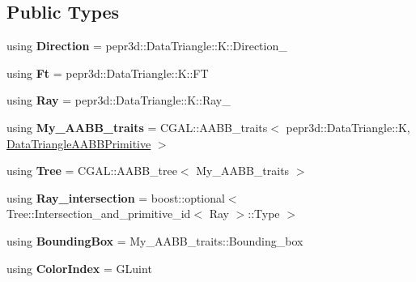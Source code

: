\subsection*{Public Types}
\begin{DoxyCompactItemize}
\item 
\mbox{\label{classpepr3d_1_1_geometry_a6077ec326305ac7fe4c3f6819b53c2fb}} 
using {\bfseries Direction} = pepr3d\+::\+Data\+Triangle\+::\+K\+::\+Direction\+\_
\item 
\mbox{\label{classpepr3d_1_1_geometry_a2902716bce3c243a990d3b89b1e3e62b}} 
using {\bfseries Ft} = pepr3d\+::\+Data\+Triangle\+::\+K\+::\+FT
\item 
\mbox{\label{classpepr3d_1_1_geometry_abf08f06fad7e1acf0298bbb32418ef0a}} 
using {\bfseries Ray} = pepr3d\+::\+Data\+Triangle\+::\+K\+::\+Ray\+\_
\item 
\mbox{\label{classpepr3d_1_1_geometry_adec6ddfe2738bb0792535ad33da96f3a}} 
using {\bfseries My\+\_\+\+A\+A\+B\+B\+\_\+traits} = C\+G\+A\+L\+::\+A\+A\+B\+B\+\_\+traits$<$ pepr3d\+::\+Data\+Triangle\+::K, \mbox{\hyperlink{structpepr3d_1_1_data_triangle_a_a_b_b_primitive}{Data\+Triangle\+A\+A\+B\+B\+Primitive}} $>$
\item 
\mbox{\label{classpepr3d_1_1_geometry_aa14c4ca4e78b66267ff0191397768159}} 
using {\bfseries Tree} = C\+G\+A\+L\+::\+A\+A\+B\+B\+\_\+tree$<$ My\+\_\+\+A\+A\+B\+B\+\_\+traits $>$
\item 
\mbox{\label{classpepr3d_1_1_geometry_a6ec337c2f2b15ab3cc65fbef4869a163}} 
using {\bfseries Ray\+\_\+intersection} = boost\+::optional$<$ Tree\+::\+Intersection\+\_\+and\+\_\+primitive\+\_\+id$<$ Ray $>$\+::Type $>$
\item 
\mbox{\label{classpepr3d_1_1_geometry_a817ca5983c6140981a78819b090bb899}} 
using {\bfseries Bounding\+Box} = My\+\_\+\+A\+A\+B\+B\+\_\+traits\+::\+Bounding\+\_\+box
\item 
\mbox{\label{classpepr3d_1_1_geometry_af654ca82ebbd5dd354a71af346937c32}} 
using {\bfseries Color\+Index} = G\+Luint
\end{DoxyCompactItemize}

